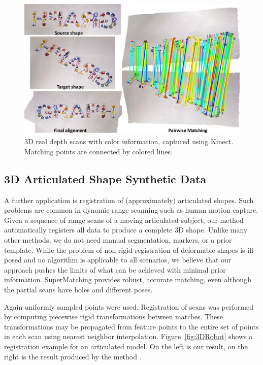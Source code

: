 \begin{figure}[h]
\centering
  \includegraphics[width=1.05\linewidth]{figures/kinect.pdf}
  \caption{3D real depth scans with color information, captured using Kinect.
    Matching points are connected by colored lines.}
\label{fig:3DReal}
\end{figure}

\subsection{3D Articulated Shape Synthetic Data}
\label{subsec:3darticulated}

A further application is registration of (approximately) articulated shapes. Such problems are common in dynamic range scanning such as human motion capture.
Given a sequence of range scans of a moving articulated subject, our method automatically registers all data to produce a complete 3D shape.
Unlike many other methods, we do not need  manual segmentation, markers, or a prior template.
While the problem of non-rigid registration of deformable shapes is ill-posed and no algorithm is applicable to all scenarios,
we believe that our approach pushes the limits of what can be achieved with minimal prior information. SuperMatching provides robust, accurate matching,
even although the partial scans have holes and different poses.

Again uniformly sampled points were used. Registration of scans was performed by computing piecewise rigid transformations between matches.
These transformations may be propagated from feature points to the entire set of points in each scan using nearest neighbor interpolation.
Figure~\ref{fig:3DRobot} shows a registration example for an articulated model.
On the left is our result, on the right is the result produced by the method \cite{Chang09}.

